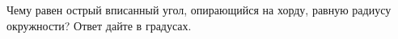 \begin{ex}
	\begin{condition}
		Чему равен острый вписанный угол, опирающийся на хорду, равную радиусу окружности? Ответ дайте в градусах.
	\end{condition}
\end{ex}